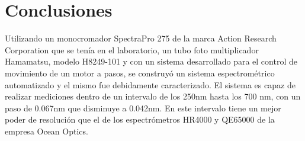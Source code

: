 \chapter*{Conclusiones}
Utilizando un monocromador SpectraPro 275 de la marca Action Research Corporation que se tenía en el laboratorio, un tubo foto multiplicador Hamamatsu, modelo H8249-101 y con un sistema desarrollado para el control de movimiento de un motor a pasos, se construyó un sistema espectrométrico automatizado y el mismo fue debidamente caracterizado.
El sistema es capaz de realizar mediciones dentro de un intervalo de los 250nm hasta los 700 nm, con un paso de 0.067nm que disminuye a 0.042nm. En este intervalo tiene un mejor poder de resolución que el de los espectrómetros HR4000 y QE65000 de la empresa Ocean Optics. \\

%
%


